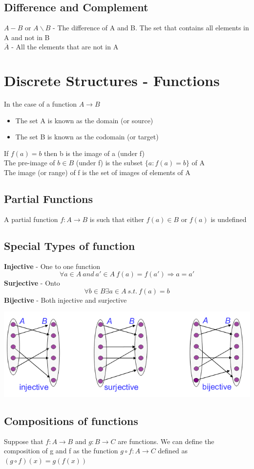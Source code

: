 \documentclass{article}[18pt]
\begin{document}
\subsection{Difference and Complement}
$A-B$ or $A \backslash B$ - The difference of A and B. The set that contains all elements in A and not in B\\
$\overline{A}$ - All the elements that are not in A
\section{Discrete Structures - Functions}
In the case of a function $A\rightarrow B$
\begin{itemize}
	\item The set A is known as the domain (or source)
	\item The set B is known as the codomain (or target)
\end{itemize}
If $f(a)=b$ then b is the image of a (under f)\\
The pre-image of $b\in B$ (under f) is the subset $\{a: f(a)=b\}$ of A\\
The image (or range) of f is the set of images of elements of A
\subsection{Partial Functions}
A partial function $f:A\rightarrow B$ is such that either $f(a)\in B$ or $f(a)$ is undefined
\subsection{Special Types of function}
\textbf{Injective} - One to one function
$$\forall a\in A \ and  \ a'\in A \  f(a)=f(a')\Rightarrow a=a'$$
\textbf{Surjective} - Onto
$$\forall b\in B \exists a\in A \ s.t. \ f(a)=b$$
\textbf{Bijective} - Both injective and surjective
\begin{center}
	\includegraphics[scale=0.7]{"Types of Function"}
\end{center}
\subsection{Compositions of functions}
Suppose that $f:A\rightarrow B$ and $g:B\rightarrow C$ are functions. We can define the composition of g and f as the function $g\circ f: A\rightarrow C$ defined as $(g\circ f)(x)=g(f(x))$
\end{document}
